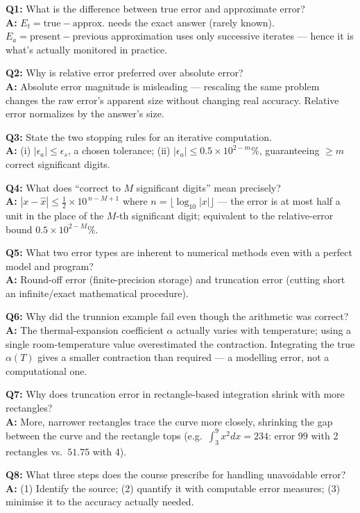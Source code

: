 \begin{qabox}
\textbf{Q1:} What is the difference between true error and approximate error? \\
\textbf{A:} $E_t=\text{true}-\text{approx.}$ needs the exact answer (rarely known). $E_a=\text{present}-\text{previous}$ approximation uses only successive iterates — hence it is what's actually monitored in practice.

\textbf{Q2:} Why is relative error preferred over absolute error? \\
\textbf{A:} Absolute error magnitude is misleading — rescaling the same problem changes the raw error's apparent size without changing real accuracy. Relative error normalizes by the answer's size.

\textbf{Q3:} State the two stopping rules for an iterative computation. \\
\textbf{A:} (i) $|\epsilon_a|\le\epsilon_s$, a chosen tolerance; (ii) $|\epsilon_a|\le0.5\times10^{2-m}\%$, guaranteeing $\ge m$ correct significant digits.

\textbf{Q4:} What does ``correct to $M$ significant digits'' mean precisely? \\
\textbf{A:} $|x-\hat x|\le\tfrac12\times10^{\,n-M+1}$ where $n=\lfloor\log_{10}|x|\rfloor$ — the error is at most half a unit in the place of the $M$-th significant digit; equivalent to the relative-error bound $0.5\times10^{2-M}\%$.

\textbf{Q5:} What two error types are inherent to numerical methods even with a perfect model and program? \\
\textbf{A:} Round-off error (finite-precision storage) and truncation error (cutting short an infinite/exact mathematical procedure).

\textbf{Q6:} Why did the trunnion example fail even though the arithmetic was correct? \\
\textbf{A:} The thermal-expansion coefficient $\alpha$ actually varies with temperature; using a single room-temperature value overestimated the contraction. Integrating the true $\alpha(T)$ gives a smaller contraction than required — a modelling error, not a computational one.

\textbf{Q7:} Why does truncation error in rectangle-based integration shrink with more rectangles? \\
\textbf{A:} More, narrower rectangles trace the curve more closely, shrinking the gap between the curve and the rectangle tops (e.g.\ $\int_3^9x^2dx=234$: error $99$ with 2 rectangles vs.\ $51.75$ with 4).

\textbf{Q8:} What three steps does the course prescribe for handling unavoidable error? \\
\textbf{A:} (1) Identify the source; (2) quantify it with computable error measures; (3) minimise it to the accuracy actually needed.
\end{qabox}
